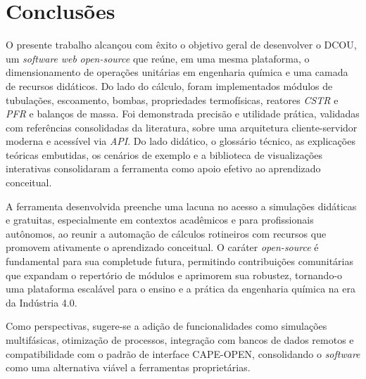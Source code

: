 \chapter{Conclusões}

O presente trabalho alcançou com êxito o objetivo geral de desenvolver o DCOU, um \textit{software} \textit{web} \textit{open-source} que reúne, em uma mesma plataforma, o dimensionamento de operações unitárias em engenharia química e uma camada de recursos didáticos. Do lado do cálculo, foram implementados módulos de tubulações, escoamento, bombas, propriedades termofísicas, reatores \textit{CSTR} e \textit{PFR} e balanços de massa. Foi demonstrada precisão e utilidade prática, validadas com referências consolidadas da literatura, sobre uma arquitetura cliente-servidor moderna e acessível via \textit{API}. Do lado didático, o glossário técnico, as explicações teóricas embutidas, os cenários de exemplo e a biblioteca de visualizações interativas consolidaram a ferramenta como apoio efetivo ao aprendizado conceitual.

A ferramenta desenvolvida preenche uma lacuna no acesso a simulações didáticas e gratuitas, especialmente em contextos acadêmicos e para profissionais autônomos, ao reunir a automação de cálculos rotineiros com recursos que promovem ativamente o aprendizado conceitual. O caráter \textit{open-source} é fundamental para sua completude futura, permitindo contribuições comunitárias que expandam o repertório de módulos e aprimorem sua robustez, tornando-o uma plataforma escalável para o ensino e a prática da engenharia química na era da Indústria 4.0.

Como perspectivas, sugere-se a adição de funcionalidades como simulações multifásicas, otimização de processos, integração com bancos de dados remotos e compatibilidade com o padrão de interface CAPE-OPEN, consolidando o \textit{software} como uma alternativa viável a ferramentas proprietárias.
